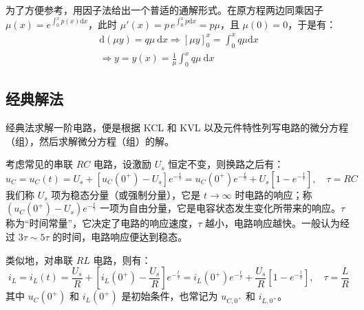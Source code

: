 \documentclass[UTF8]{report}
\theoremstyle{MyLineTheoremStyle} %
\theoremstyle{MyBlockTheoremStyle} %
\theoremstyle{MySubsubsectionStyle} %
\begin{document}
为了方便参考，用因子法给出一个普适的通解形式。在原方程两边同乘因子 $\mu(x) = e^{\int_{0}^{x}p(x)\mathrm{d}x}$，此时 $\mu'(x) = p\, e^{\int_{0}^{x}p \mathrm{d}x} = p \mu$，且 $\mu(0) = 0$，于是有：
\begin{gather}
\mathrm{d} \left(\mu y \right) = q\mu\ \mathrm{d}x
\Longrightarrow 
\left[\mu y\right]_0^x = \int_{0}^{x} q \mu \mathrm{d}x \\ 
\Longrightarrow y = y(x) = \frac{1}{\mu} \int_{0}^{x} q \mu\ \mathrm{d}x 
\end{gather}

\subsection{经典解法}

经典法求解一阶电路，便是根据 KCL 和 KVL 以及元件特性列写电路的微分方程（组），然后求解微分方程（组）的解。

考虑常见的串联 $RC$ 电路，设激励 $U_s$ 恒定不变，则换路之后有：
\begin{equation}
u_C = u_C(t) = U_s + \left[u_C(0^+) - U_s\right] e^{-\frac{t}{\tau}} = u_C(0^+)e^{-\frac{t}{\tau}} + U_s\left[1 - e^{-\frac{t}{\tau}}\right],\quad \tau = RC
\end{equation}
我们称 $U_s$ 项为稳态分量（或强制分量），它是 $t \to \infty$ 时电路的响应；称 $\left(u_C(0^+) - U_s\right) e^{-\frac{t}{\tau}}$ 一项为自由分量，它是电容状态发生变化所带来的响应。$\tau$ 称为“时间常量”，它决定了电路的响应速度，$\tau$ 越小，电路响应越快。一般认为经过 $3\tau \sim 5 \tau$ 的时间，电路响应便达到稳态。

类似地，对串联 $RL$ 电路，则有：
\begin{equation}
i_L = i_L(t) = \frac{U_s}{R} + \left[i_L(0^+) - \frac{U_s}{R}\right]e^{-\frac{t}{\tau}} = i_L(0^+)e^{-\frac{t}{\tau}} + \frac{U_s}{R}\left[1 - e^{-\frac{t}{\tau}}\right],\quad \tau = \frac{L}{R}
\end{equation}
其中 $u_C(0^+)$ 和 $i_L(0^+)$ 是初始条件，也常记为 $u_{C,0^+}$ 和 $i_{L,0^+}$。
\end{document}
